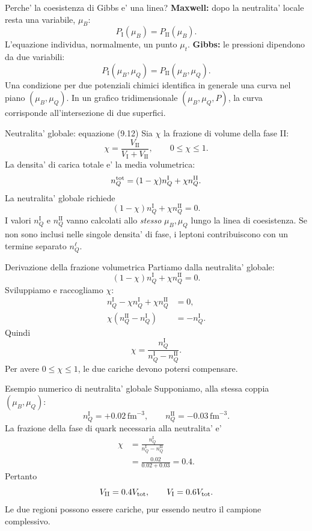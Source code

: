 \begin{frame}{Perche' la coesistenza di Gibbs e' una linea?}
\small
\textbf{Maxwell:} dopo la neutralita' locale resta una variabile,
$\mu_B$:
\[
P_{\mathrm I}(\mu_B)=P_{\mathrm{II}}(\mu_B).
\]
L'equazione individua, normalmente, un punto $\mu_t$.
\medskip
\textbf{Gibbs:} le pressioni dipendono da due variabili:
\[
P_{\mathrm I}(\mu_B,\mu_Q)
=P_{\mathrm{II}}(\mu_B,\mu_Q).
\]
Una condizione per due potenziali chimici identifica in generale
una curva nel piano $(\mu_B,\mu_Q)$.
\medskip
In un grafico tridimensionale $(\mu_B,\mu_Q,P)$, la curva
corrisponde all'intersezione di due superfici.
\end{frame}

\begin{frame}{Neutralita' globale: equazione (9.12)}
\small
Sia $\chi$ la frazione di volume della fase II:
\[
\chi=\frac{V_{\mathrm{II}}}{V_{\mathrm I}+V_{\mathrm{II}}},
\qquad 0\le\chi\le1.
\]
La densita' di carica totale e' la media volumetrica:
\[
n_Q^{\rm tot}=(1-\chi)n_Q^{\mathrm I}
+\chi n_Q^{\mathrm{II}}.
\]
La neutralita' globale richiede
\[
(1-\chi)n_Q^{\mathrm I}+\chi n_Q^{\mathrm{II}}=0.
\]
I valori $n_Q^{\mathrm I}$ e $n_Q^{\mathrm{II}}$ vanno calcolati
allo \emph{stesso} $\mu_B,\mu_Q$ lungo la linea di coesistenza.
\medskip
\footnotesize
Se non sono inclusi nelle singole densita' di fase, i leptoni
contribuiscono con un termine separato $n_Q^{\ell}$.
\end{frame}

\begin{frame}{Derivazione della frazione volumetrica}
\small
Partiamo dalla neutralita' globale:
\[
(1-\chi)n_Q^{\mathrm I}+\chi n_Q^{\mathrm{II}}=0.
\]
Sviluppiamo e raccogliamo $\chi$:
\[
\begin{aligned}
n_Q^{\mathrm I}-\chi n_Q^{\mathrm I}
+\chi n_Q^{\mathrm{II}}&=0,\\
\chi(n_Q^{\mathrm{II}}-n_Q^{\mathrm I})&=-n_Q^{\mathrm I}.
\end{aligned}
\]
Quindi
\[
\chi=\frac{n_Q^{\mathrm I}}
{n_Q^{\mathrm I}-n_Q^{\mathrm{II}}}.
\]
Per avere $0\le\chi\le1$, le due cariche devono potersi compensare.
\end{frame}

\begin{frame}{Esempio numerico di neutralita' globale}
\small
Supponiamo, alla stessa coppia $(\mu_B,\mu_Q)$:
\[
n_Q^{\mathrm I}=+0.02\,\mathrm{fm}^{-3},
\qquad n_Q^{\mathrm{II}}=-0.03\,\mathrm{fm}^{-3}.
\]
La frazione della fase di quark necessaria alla neutralita' e'
\[
\begin{aligned}
\chi&=\frac{n_Q^{\mathrm I}}{n_Q^{\mathrm I}-n_Q^{\mathrm{II}}}\\
&=\frac{0.02}{0.02+0.03}=0.4.
\end{aligned}
\]
Pertanto
\[
V_{\mathrm{II}}=0.4V_{\rm tot},
\qquad V_{\mathrm I}=0.6V_{\rm tot}.
\]
Le due regioni possono essere cariche, pur essendo
neutro il campione complessivo.
\end{frame}

